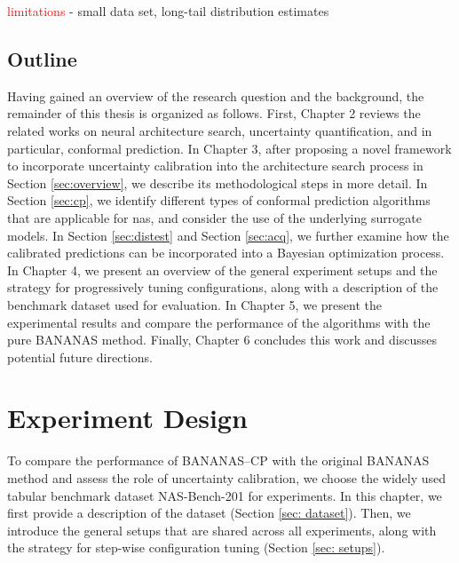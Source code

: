 \documentclass[a4paper,oneside,bibliography=totoc]{scrbook}
\begin{document}
\textcolor{red}{limitations}
- small data set, long-tail distribution estimates


\section{Outline}
Having gained an overview of the research question and the background, the remainder of this thesis is organized as follows. First, Chapter 2 reviews the related works on neural architecture search, uncertainty quantification, and in particular, conformal prediction. In Chapter 3, after proposing a novel framework to incorporate uncertainty calibration into the architecture search process in Section \ref{sec:overview}, we describe its methodological steps in more detail. In Section \ref{sec:cp}, we identify different types of conformal prediction algorithms that are applicable for \gls{nas}, and consider the use of the underlying surrogate models. In Section \ref{sec:distest} and Section \ref{sec:acq}, we further examine how the calibrated predictions can be incorporated into a Bayesian optimization process. In Chapter 4, we present an overview of the general experiment setups and the strategy for progressively tuning configurations, along with a description of the benchmark dataset used for evaluation. In Chapter 5, we present the experimental results and compare the performance of the algorithms with the pure BANANAS method. Finally, Chapter 6 concludes this work and discusses potential future directions.  





\chapter{Experiment Design}
\label{ch4}
To compare the performance of BANANAS--CP with the original BANANAS method and assess the role of uncertainty calibration, we choose the widely used tabular benchmark dataset NAS-Bench-201 \cite{dong2020nasbench201} for experiments. In this chapter, we first provide a description of the dataset (Section \ref{sec: dataset}). Then, we introduce the general setups that are shared across all experiments, along with the strategy for step-wise configuration tuning  (Section \ref{sec: setups}).
\end{document}
